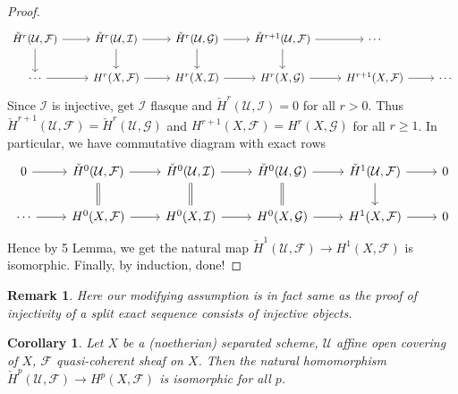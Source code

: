 \documentclass{ctexart}
\newtheorem{remark}{Remark}[section]
\newtheorem{corollary}{Corollary}[section]
\begin{document}
\begin{proof}
\begin{equation}
\begin{tikzcd}
            \check{H}^{r}(\mathcal{U}, \mathcal{F}) \arrow[r] \arrow[d] &
            \check{H}^{r}(\mathcal{U}, \mathcal{I}) \arrow[r] \arrow[d] &
            \check{H}^{r}(\mathcal{U}, \mathcal{G}) \arrow[r] \arrow[d] &
            \check{H}^{r + 1}(\mathcal{U}, \mathcal{F}) \arrow[r] \arrow[d] &
            \cdots \\
            \cdots \arrow[r] &
            H^{r}(X, \mathcal{F}) \arrow[r] &
            H^{r}(X, \mathcal{I}) \arrow[r] &
            H^{r}(X, \mathcal{G}) \arrow[r] &
            H^{r + 1}(X, \mathcal{F}) \arrow[r] &
            \cdots
        \end{tikzcd}
    \end{equation}
    Since $\mathcal{I}$ is injective, get $\mathcal{I}$ flasque and $\check{H}^{r}(\mathcal{U}, \mathcal{I}) = 0$ for all $r > 0$.
    Thus $\check{H}^{r + 1}(\mathcal{U}, \mathcal{F}) = \check{H}^{r}(\mathcal{U}, \mathcal{G})$ and $H^{r + 1}(X, \mathcal{F}) = H^{r}(X, \mathcal{G})$ for all $r \ge 1$.
    In particular, we have commutative diagram with exact rows
    \begin{equation}
        \begin{tikzcd}
            0 \arrow[r] &
            \check{H}^{0}(\mathcal{U}, \mathcal{F}) \arrow[r] \arrow[d, equal] &
            \check{H}^{0}(\mathcal{U}, \mathcal{I}) \arrow[r] \arrow[d, equal] &
            \check{H}^{0}(\mathcal{U}, \mathcal{G}) \arrow[r] \arrow[d, equal] &
            \check{H}^{1}(\mathcal{U}, \mathcal{F}) \arrow[r] \arrow[d] &
            0 \\
            \cdots \arrow[r] &
            H^{0}(X, \mathcal{F}) \arrow[r] &
            H^{0}(X, \mathcal{I}) \arrow[r] &
            H^{0}(X, \mathcal{G}) \arrow[r] &
            H^{1}(X, \mathcal{F}) \arrow[r] &
            0
        \end{tikzcd}
    \end{equation}
    Hence by 5 Lemma, we get the natural map $\check{H}^{1}(\mathcal{U}, \mathcal{F}) \rightarrow H^{1}(X, \mathcal{F})$ is isomorphic.
    Finally, by induction, done!
\end{proof}
\begin{remark}
    Here our modifying assumption is in fact same as the proof of injectivity of a split exact sequence consists of injective objects.
\end{remark}
\begin{corollary}
    Let $X$ be a (noetherian) separated scheme, $\mathcal{U}$ affine open covering of $X$, $\mathcal{F}$ quasi-coherent sheaf on $X$.
    Then the natural homomorphism $\check{H}^{p}(\mathcal{U}, \mathcal{F}) \longrightarrow H^{p}(X, \mathcal{F})$ is isomorphic for all $p$.
    \label{Corollary 2.6}
\end{corollary}
\end{document}
